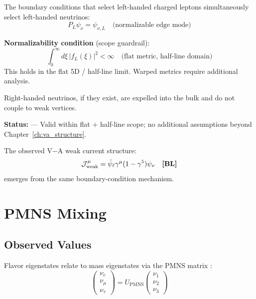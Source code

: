 \begin{tcolorbox}[colback=green!5!white, colframe=green!50!black,
    title=\textbf{Left-Handed Neutrinos}]
The boundary conditions that select left-handed charged leptons simultaneously
select left-handed neutrinos:
\begin{equation}
    P_L \psi_\nu = \psi_{\nu,L} \quad \text{(normalizable edge mode)}
\end{equation}

\textbf{Normalizability condition} (scope guardrail):
\begin{equation}
\int_0^\infty d\xi \, |f_L(\xi)|^2 < \infty \quad \text{(flat metric, half-line domain)}
\end{equation}
This holds in the flat 5D / half-line limit. Warped metrics require additional analysis.

Right-handed neutrinos, if they exist, are expelled into the bulk and do not
couple to weak vertices.

\textbf{Status:} \tagDcApprox{} --- Valid within flat + half-line scope; no additional
assumptions beyond Chapter~\ref{ch:va_structure}.
\end{tcolorbox}

The observed V$-$A weak current structure:
\begin{equation}
    \mathcal{J}^\mu_{\text{weak}} = \bar\psi_\ell \gamma^\mu (1 - \gamma^5) \psi_\nu
    \quad \textbf{[BL]}{}
\end{equation}
emerges from the same boundary-condition mechanism.

\section{PMNS Mixing}
\label{sec:pmns}

\subsection{Observed Values}

Flavor eigenstates relate to mass eigenstates via the PMNS matrix \tagBL{}:
\begin{equation}
    \begin{pmatrix} \nu_e \\ \nu_\mu \\ \nu_\tau \end{pmatrix}
    = U_{\text{PMNS}}
    \begin{pmatrix} \nu_1 \\ \nu_2 \\ \nu_3 \end{pmatrix}
\end{equation}

